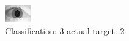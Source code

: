 \begin{figure}[h!]
\begin{center}
\includegraphics[width=0.60\columnwidth]{figures/ID1740_class_3_target_2.png}
\end{center}
\caption{ Classification: 3 actual target: 2}
\label{fig:ID1740_class_3_target_2}
\end{figure}
